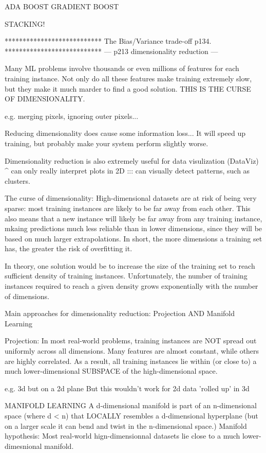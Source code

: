 ADA BOOST
GRADIENT BOOST

STACKING!

***************************
The Bias/Variance trade-off
p134.
***************************
---
p213 dimensionality reduction
---

Many ML problems involve thousands or even millions of features for each training instance.
Not only do all these features make training extremely slow,
but they make it much marder to find a good solution.
THIS IS THE CURSE OF DIMENSIONALITY.

e.g. merging pixels, ignoring outer pixels...

Reducing dimensionality does cause some information loss...
It will speed up training, but probably make your system perform slightly worse.

Dimensionality reduction is also extremely useful for data visulization (DataViz)
^ can only really interpret plots in 2D ::: can visually detect patterns, such as clusters.


The curse of dimensionality:
High-dimensional datasets are at risk of being very sparse:
most training instances are likely to be far away from each other.
This also means that a new instance will likely be far away from any training instance,
mkaing predictions much less reliable than in lower dimensions,
since they will be based on much larger extrapolations.
In short, the more dimensions a training set has,
the greater the risk of overfitting it.

In theory,
one solution would be to increase the size of the training set to reach sufficient density of training instances.
Unfortunately,
the number of training instances required to reach a given density grows exponentially with the number of dimensions.

Main approaches for dimensionality reduction:
Projection AND Manifold Learning

Projection:
In most real-world problems,
training instances are NOT spread out uniformly across all dimensions.
Many features are almost constant,
while others are highly correlated.
As a result, all training instances lie within (or close to)
a much lower-dimensional SUBSPACE of the high-dimensional space.

e.g. 3d but on a 2d plane
But this wouldn't work for 2d data 'rolled up' in 3d

MANIFOLD LEARNING
A d-dimensional manifold is part of an n-dimensional space (where d < n)
that LOCALLY resembles a d-dimensional hyperplane
(but on a larger scale it can bend and twist in the n-dimensional space.)
Manifold hypothesis:
Most real-world hign-dimensionnal datasets lie close to a much lower-dimesnional manifold.

